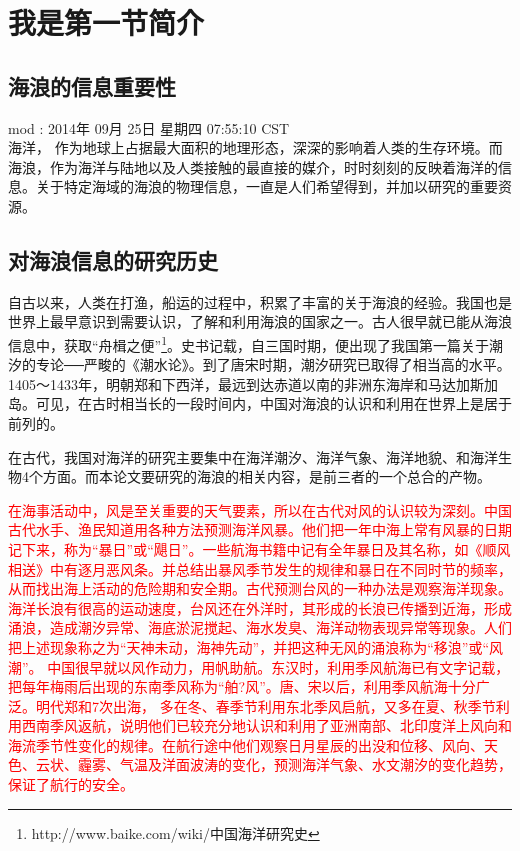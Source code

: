 \section{我是第一节简介}

\subsection{海浪的信息重要性}
mod : 2014年 09月 25日 星期四 07:55:10 CST\\

海洋， 作为地球上占据最大面积的地理形态，深深的影响着人类的生存环境。而海浪，作为海洋与陆地以及人类接触的最直接的媒介，时时刻刻的反映着海洋的信息。关于特定海域的海浪的物理信息，一直是人们希望得到，并加以研究的重要资源。

\subsection{对海浪信息的研究历史}
自古以来，人类在打渔，船运的过程中，积累了丰富的关于海浪的经验。我国也是世界上最早意识到需要认识，了解和利用海浪的国家之一。古人很早就已能从海浪信息中，获取“舟楫之便”\footnote{http://www.baike.com/wiki/中国海洋研究史}。史书记载，自三国时期，便出现了我国第一篇关于潮汐的专论──严畯的《潮水论》。到了唐宋时期，潮汐研究已取得了相当高的水平。1405～1433年，明朝郑和下西洋，最远到达赤道以南的非洲东海岸和马达加斯加岛。可见，在古时相当长的一段时间内，中国对海浪的认识和利用在世界上是居于前列的。

在古代，我国对海洋的研究主要集中在海洋潮汐、海洋气象、海洋地貌、和海洋生物4个方面。而本论文要研究的海浪的相关内容，是前三者的一个总合的产物。

\textcolor{red}{
在海事活动中，风是至关重要的天气要素，所以在古代对风的认识较为深刻。中国古代水手、渔民知道用各种方法预测海洋风暴。他们把一年中海上常有风暴的日期记下来，称为“暴日”或“飓日”。一些航海书籍中记有全年暴日及其名称，如《顺风相送》中有逐月恶风条。并总结出暴风季节发生的规律和暴日在不同时节的频率，从而找出海上活动的危险期和安全期。古代预测台风的一种办法是观察海洋现象。海洋长浪有很高的运动速度，台风还在外洋时，其形成的长浪已传播到近海，形成涌浪，造成潮汐异常、海底淤泥搅起、海水发臭、海洋动物表现异常等现象。人们把上述现象称之为“天神未动，海神先动”，并把这种无风的涌浪称为“移浪”或“风潮”。
中国很早就以风作动力，用帆助航。东汉时，利用季风航海已有文字记载，把每年梅雨后出现的东南季风称为“舶?风”。唐、宋以后，利用季风航海十分广泛。明代郑和7次出海， 多在冬、春季节利用东北季风启航，又多在夏、秋季节利用西南季风返航，说明他们已较充分地认识和利用了亚洲南部、北印度洋上风向和海流季节性变化的规律。在航行途中他们观察日月星辰的出没和位移、风向、天色、云状、霾雾、气温及洋面波涛的变化，预测海洋气象、水文潮汐的变化趋势，保证了航行的安全。
}



